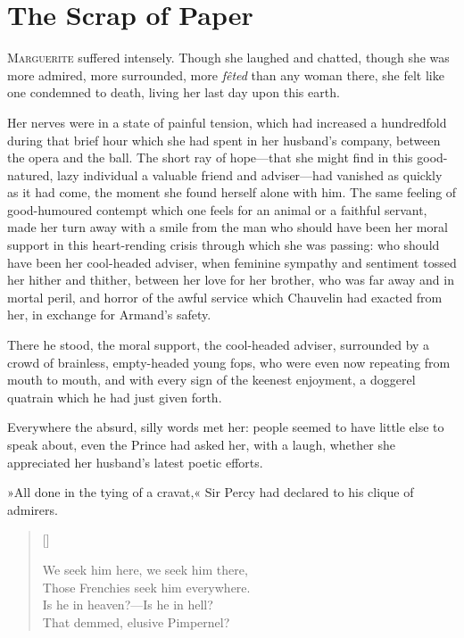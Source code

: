 
\chapter{The Scrap of Paper}
\lettrine[lines=4]{M}{arguerite} suffered intensely. Though she laughed and chatted, though she was more admired, more surrounded, more \textit{fêted} than any woman there, she felt like one condemned to death, living her last day upon this earth.

Her nerves were in a state of painful tension, which had increased a hundredfold during that brief hour which she had spent in her husband's company, between the opera and the ball. The short ray of hope—that she might find in this good-natured, lazy individual a valuable friend and adviser—had vanished as quickly as it had come, the moment she found herself alone with him. The same feeling of good-humoured contempt which one feels for an animal or a faithful servant, made her turn away with a smile from the man who should have been her moral support in this heart-rending crisis through which she was passing: who should have been her cool-headed adviser, when feminine sympathy and sentiment tossed her hither and thither, between her love for her brother, who was far away and in mortal peril, and horror of the awful service which Chauvelin had exacted from her, in exchange for Armand's safety.

There he stood, the moral support, the cool-headed adviser, surrounded by a crowd of brainless, empty-headed young fops, who were even now repeating from mouth to mouth, and with every sign of the keenest enjoyment, a doggerel quatrain which he had just given forth.

Everywhere the absurd, silly words met her: people seemed to have little else to speak about, even the Prince had asked her, with a laugh, whether she appreciated her husband's latest poetic efforts.

»All done in the tying of a cravat,« Sir Percy had declared to his clique of admirers.

\settowidth{\versewidth}{We seek him here, we seek him there,}
\begin{verse}[\versewidth]
\begin{altverse}
We seek him here, we seek him there,\\
Those Frenchies seek him everywhere.\\
Is he in heaven?—Is he in hell?\\
That demmed, elusive Pimpernel?
\end{altverse}
\end{verse}


